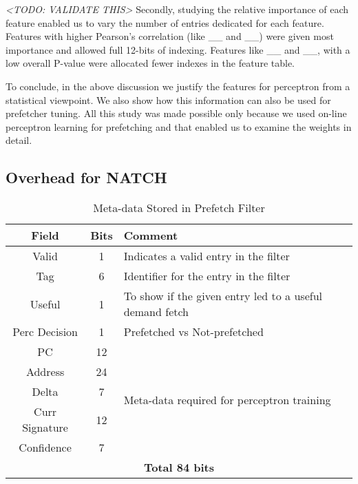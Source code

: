 \textit{<TODO: VALIDATE THIS>} Secondly, studying the relative
importance of each feature enabled us to vary the number of entries
dedicated for each feature.  Features with higher Pearson's
correlation (like \_\_ and \_\_) were given most importance and
allowed full 12-bits of indexing.  Features like \_\_ and \_\_, with a
low overall P-value were allocated fewer indexes in the feature table.

To conclude, in the above discussion we justify the features for
perceptron from a statistical viewpoint.  We also show how this
information can also be used for prefetcher tuning.  All this study
was made possible only because we used on-line perceptron learning for
prefetching and that enabled us to examine the weights in detail.


\subsection{Overhead for NATCH}
\label{Method-Overheads}

\begin{table}[]
    \centering
    \begin{tabular}{|c|c|m{4.8cm}|}
    \hline
        \textbf{Field} &
        \textbf{Bits} &
        \textbf{Comment} \\
    \hline
         Valid & 1 & Indicates a valid entry in the filter\\
         Tag & 6 & Identifier for the entry in the filter\\
         Useful & 1 & To show if the given entry led to a useful demand fetch\\
         Perc Decision & 1 & Prefetched vs Not-prefetched \\
    \hline
        PC & 12 & \multirow{5}{4.8cm}{Meta-data required for perceptron training}\\
        Address & 24 & \\
        Delta & 7 & \\
        Curr Signature & 12 & \\
        Confidence & 7 & \\
    \hline
        \multicolumn{3}{|c|}{\textbf{Total 84 bits}}\\
    \hline
    \end{tabular}
    \caption{Meta-data Stored in Prefetch Filter}
    \label{tab:PF_metadata}
\end{table}


